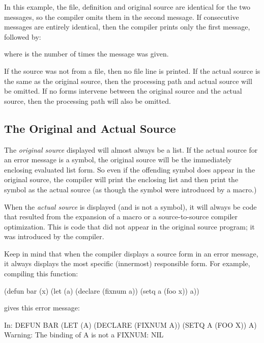 In this example, the file, definition and original source are
identical for the two messages, so the compiler omits them in the
second message.  If consecutive messages are entirely identical, then
the compiler prints only the first message, followed by:

\begin{example}
\end{example}

where  is the number of times the message was given.

If the source was not from a file, then no file line is printed.  If
the actual source is the same as the original source, then the
processing path and actual source will be omitted.  If no forms
intervene between the original source and the actual source, then the
processing path will also be omitted.


\subsection{The Original and Actual Source}

The {\em original source} displayed will almost always be a list.  If the actual
source for an error message is a symbol, the original source will be the
immediately enclosing evaluated list form.  So even if the offending symbol
does appear in the original source, the compiler will print the enclosing list
and then print the symbol as the actual source (as though the symbol were
introduced by a macro.)

When the {\em actual source} is displayed (and is not a symbol), it will always
be code that resulted from the expansion of a macro or a source-to-source
compiler optimization.  This is code that did not appear in the original
source program; it was introduced by the compiler.

Keep in mind that when the compiler displays a source form in an error message,
it always displays the most specific (innermost) responsible form.  For
example, compiling this function:

\begin{lisp}
(defun bar (x)
  (let (a)
    (declare (fixnum a))
    (setq a (foo x))
    a))
\end{lisp}

gives this error message:

\begin{example}
In: DEFUN BAR
  (LET (A) (DECLARE (FIXNUM A)) (SETQ A (FOO X)) A)
Warning: The binding of A is not a FIXNUM:
  NIL
\end{example}

